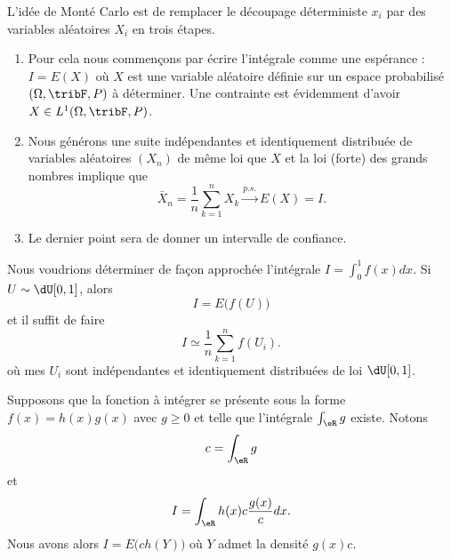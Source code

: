 L'idée de Monté Carlo est de remplacer le découpage déterministe \( x_i\) par des variables aléatoires \( X_i\) en trois étapes. 

\begin{enumerate}
    \item
        Pour cela nous commençons par écrire l'intégrale comme une espérance : \( I=E(X)\) où \( X\) est une variable aléatoire définie sur un espace probabilisé \( (\Omega,\tribF,P)\) à déterminer. Une contrainte est évidemment d'avoir \( X\in L^1(\Omega,\tribF,P)\).

    \item
        Nous générons une suite indépendantes et identiquement distribuée de variables aléatoires \( (X_n)\) de même loi que \( X\) et la loi (forte) des grands nombres implique que
        \begin{equation}
            \bar X_n=\frac{1}{ n }\sum_{k=1}^nX_k\stackrel{p.s.}{\longrightarrow} E(X)=I.
        \end{equation}
        
    \item
        Le dernier point sera de donner un intervalle de confiance.
\end{enumerate}
 
\begin{example}     \label{ExempleIintfdxEXu}
    Nous voudrions déterminer de façon approchée l'intégrale \( I=\int_0^1 f(x)dx\). Si \( U\sim\dU\mathopen[ 0 , 1 \mathclose]\), alors
    \begin{equation}
        I=E\big( f(U) \big)
    \end{equation}
    et il suffit de faire
    \begin{equation}
        I\simeq\frac{1}{ n }\sum_{k=1}^nf(U_i).
    \end{equation}
    où mes \( U_i\) sont indépendantes et identiquement distribuées de loi \( \dU\mathopen[ 0 , 1 \mathclose]\).
\end{example}

\begin{example}
    Supposons que la fonction à intégrer se présente sous la forme \( f(x)=h(x)g(x)\) avec \( g\geq 0\) et telle que l'intégrale \( \int_{\eR}g\) existe. Notons
    \begin{equation}
        c=\int_{\eR}g
    \end{equation}
    et
    \begin{equation}
        I=\int_{\eR}h(x)c\frac{ g(x) }{ c }dx.
    \end{equation}
    Nous avons alors \( I=E\big( ch(Y) \big)\) où \( Y\) admet la densité \( g(x)c\).
\end{example}

